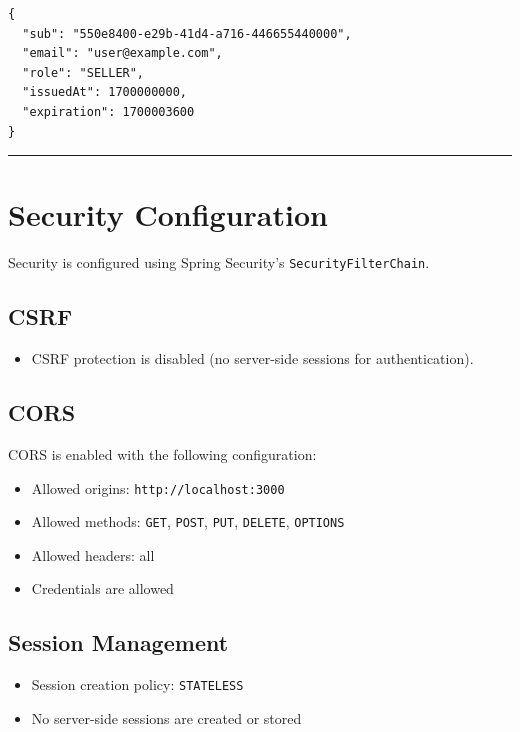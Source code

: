 \documentclass[a4paper,11pt]{article}
\begin{document}
\begin{lstlisting}
{
  "sub": "550e8400-e29b-41d4-a716-446655440000",
  "email": "user@example.com",
  "role": "SELLER",
  "issuedAt": 1700000000,
  "expiration": 1700003600
}
\end{lstlisting}

\hrule
\vspace{1em}

\section{Security Configuration}

Security is configured using Spring Security's \texttt{SecurityFilterChain}.

\subsection{CSRF}

\begin{itemize}
  \item CSRF protection is disabled (no server-side sessions for authentication).
\end{itemize}

\subsection{CORS}

CORS is enabled with the following configuration:
\begin{itemize}
  \item Allowed origins: \texttt{http://localhost:3000}
  \item Allowed methods: \texttt{GET}, \texttt{POST}, \texttt{PUT}, \texttt{DELETE}, \texttt{OPTIONS}
  \item Allowed headers: all
  \item Credentials are allowed
\end{itemize}

\subsection{Session Management}

\begin{itemize}
  \item Session creation policy: \texttt{STATELESS}
  \item No server-side sessions are created or stored
\end{itemize}
\end{document}
